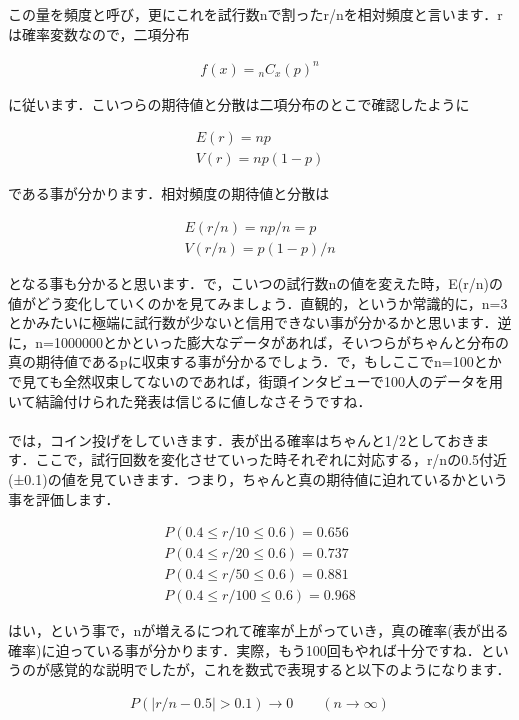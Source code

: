 \documentclass[11pt,a4paper,uplatex]{ujreport} 	%
\begin{document}
この量を頻度と呼び，更にこれを試行数nで割ったr/nを相対頻度と言います．rは確率変数なので，二項分布

\begin{align}
  f(x) = {}_n C_x (p)^n
\end{align}


に従います．こいつらの期待値と分散は二項分布のとこで確認したように

\begin{align}
  E(r) = np\\
  V(r) = np(1-p)
\end{align}

である事が分かります．相対頻度の期待値と分散は

\begin{align}
  E(r/n) = np/n = p\\
  V(r/n) = p(1-p)/n
\end{align}

となる事も分かると思います．で，こいつの試行数nの値を変えた時，E(r/n)の値がどう変化していくのかを見てみましょう．直観的，というか常識的に，n=3とかみたいに極端に試行数が少ないと信用できない事が分かるかと思います．逆に，n=1000000とかといった膨大なデータがあれば，そいつらがちゃんと分布の真の期待値であるpに収束する事が分かるでしょう．で，もしここでn=100とかで見ても全然収束してないのであれば，街頭インタビューで100人のデータを用いて結論付けられた発表は信じるに値しなさそうですね．\\
\\

では，コイン投げをしていきます．表が出る確率はちゃんと1/2としておきます．ここで，試行回数を変化させていった時それぞれに対応する，r/nの0.5付近(±0.1)の値を見ていきます．つまり，ちゃんと真の期待値に迫れているかという事を評価します．

\begin{align}
  P(0.4 \leq r/10 \leq 0.6) = 0.656\\
  P(0.4 \leq r/20 \leq 0.6) = 0.737\\
  P(0.4 \leq r/50 \leq 0.6) = 0.881\\
  P(0.4 \leq r/100 \leq 0.6) = 0.968
\end{align}

はい，という事で，nが増えるにつれて確率が上がっていき，真の確率(表が出る確率)に迫っている事が分かります．実際，もう100回もやれば十分ですね．というのが感覚的な説明でしたが，これを数式で表現すると以下のようになります．

\begin{align}
  P(|r/n -0.5| > 0.1) \longrightarrow 0\qquad(n\rightarrow\infty)
\end{align}
\end{document}
